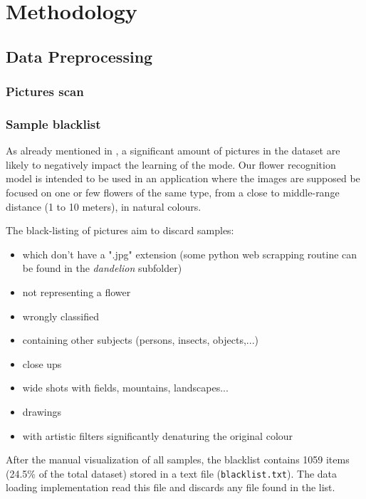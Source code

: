 \section{Methodology}

\subsection{Data Preprocessing}
\label{subsec:Data_Preprocessing}

\subsubsection{Pictures scan}

\subsubsection{Sample blacklist}

As already mentioned in , a significant amount of pictures in the dataset are likely to negatively impact the learning of the mode. Our flower recognition model is intended to be used in an application where the images are supposed be focused on one or few flowers of the same type, from a close to middle-range distance (1 to 10 meters), in natural colours.

The black-listing of pictures aim to discard samples:
\begin{itemize}
	\setlength\itemsep{1pt}
	\setlength{\parskip}{0pt}
	\setlength{\parsep}{0pt}
	\item which don't have a ".jpg" extension (some python web scrapping routine can be found in the \textit{dandelion} subfolder)
	\item not representing a flower
	\item wrongly classified
	\item containing other subjects (persons, insects, objects,...)
	\item close ups
	\item wide shots with fields, mountains, landscapes...
	\item drawings
	\item with artistic filters significantly denaturing the original colour
\end{itemize}

After the manual visualization of all samples, the blacklist contains 1059 items (24.5\% of the total dataset) stored in a text file (\texttt{blacklist.txt}). The data loading implementation read this file and discards any file found in the list. 


